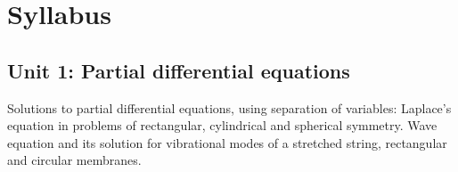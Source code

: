 \section*{Syllabus}

    \subsection*{Unit 1: Partial differential equations}
        Solutions to partial differential equations, using separation of variables: Laplace's equation in problems of rectangular, cylindrical and spherical symmetry. Wave equation and its solution for vibrational modes of a stretched string, rectangular and circular membranes.